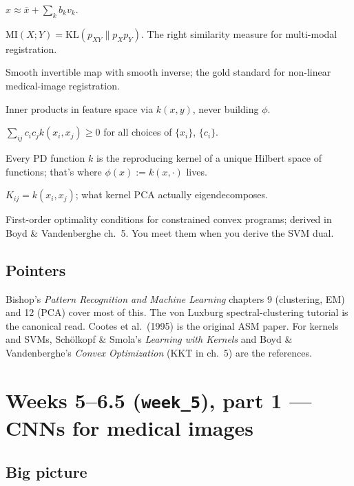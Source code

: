 \documentclass[11pt,a4paper]{article}
\newcommand{\KL}{\mathrm{KL}}
\begin{document}
\begin{description}[leftmargin=*]
        $x \approx \bar x + \sum_k b_k v_k$.
  \item[\textbf{Mutual information.}]
        $\mathrm{MI}(X;Y) = \KL(p_{XY}\|p_X p_Y)$. The right
        similarity measure for multi-modal registration.
  \item[\textbf{Diffeomorphism.}] Smooth invertible map with smooth
        inverse; the gold standard for non-linear medical-image
        registration.
  \item[\textbf{Kernel trick.}] Inner products in feature space via
        $k(x,y)$, never building $\phi$.
  \item[\textbf{Positive-definite function.}] $\sum_{ij} c_i c_j k(x_i, x_j) \ge 0$
        for all choices of $\{x_i\}$, $\{c_i\}$.
  \item[\textbf{RKHS / Moore--Aronszajn.}] Every PD function $k$ is
        the reproducing kernel of a unique Hilbert space of
        functions; that's where $\phi(x) := k(x,\cdot)$ lives.
  \item[\textbf{Gram matrix.}] $K_{ij} = k(x_i, x_j)$; what kernel
        PCA actually eigendecomposes.
  \item[\textbf{KKT conditions.}] First-order optimality conditions
        for constrained convex programs; derived in Boyd \& Vandenberghe
        ch.\ 5. You meet them when you derive the SVM dual.
\end{description}

\subsection{Pointers}

Bishop's \emph{Pattern Recognition and Machine Learning} chapters 9
(clustering, EM) and 12 (PCA) cover most of this. The von Luxburg
spectral-clustering tutorial is the canonical read. Cootes et al.\
(1995) is the original ASM paper. For kernels and SVMs, Sch\"olkopf
\& Smola's \emph{Learning with Kernels} and Boyd \& Vandenberghe's
\emph{Convex Optimization} (KKT in ch.\ 5) are the references.

\section{Weeks 5--6.5 (\texttt{week\_5}), part 1 --- CNNs for medical images}

\subsection{Big picture}
\end{document}
